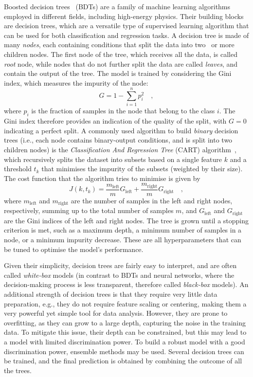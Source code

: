 Boosted decision trees~\cite{friedman2001greedy,freund1997decision} (BDTs) are a family of machine learning algorithms employed in different fields, including high-energy physics. Their building blocks are decision trees, which are a versatile type of supervised learning algorithm that can be used for both classification and regression tasks. A decision tree is made of many \emph{nodes}, each containing conditions that split the data into two~\cite{breiman2017classification} or more~\cite{quinlan1986induction} children nodes. The first node of the tree, which receives all the data, is called \emph{root} node, while nodes that do not further split the data are called \emph{leaves}, and contain the output of the tree. The model is trained by considering the Gini index, which measures the impurity of the node:
\begin{equation*}
    G = 1 - \sum_{i=1}^{n} p_{i}^{2}\quad ,
\end{equation*}
where $p_{i}$ is the fraction of samples in the node that belong to the class $i$. The Gini index therefore provides an indication of the quality of the split, with $G=0$ indicating a perfect split. A commonly used algorithm to build \emph{binary} decision trees (i.e., each node contains binary-output conditions, and is split into two children nodes) is the \emph{Classification And Regression Tree} (CART) algorithm~\cite{breiman2017classification}, which recursively splits the dataset into subsets based on a single feature $k$ and a threshold $t_k$ that minimises the impurity of the subsets (weighted by their size). The cost function that the algorithm tries to minimise is given by
\begin{equation*}
    J(k,t_k) = \frac{m_{\mathrm{left}}}{m}G_{\mathrm{left}} + \frac{m_{\mathrm{right}}}{m}G_{\mathrm{right}}\quad ,
\end{equation*}
where $m_{\mathrm{left}}$ and $m_{\mathrm{right}}$ are the number of samples in the left and right nodes, respectively, summing up to the total number of samples $m$, and $G_{\mathrm{left}}$ and $G_{\mathrm{right}}$ are the Gini indices of the left and right nodes. The tree is grown until a stopping criterion is met, such as a maximum depth, a minimum number of samples in a node, or a minimum impurity decrease. These are all hyperparameters that can be tuned to optimise the model's performance.

Given their simplicity, decision trees are fairly easy to interpret, and are often called \emph{white-box} models (in contrast to BDTs and neural networks, where the decision-making process is less transparent, therefore called \emph{black-box} models). An additional strength of decision trees is that they require
very little data preparation, e.g., they do not require feature scaling or centering, making them a very powerful yet simple tool for data analysis. However, they are prone to overfitting, as they can grow to a large depth, capturing the noise in the training data. To mitigate this issue, their depth can be constrained, but this may lead to a model with limited discrimination power. To build a robust model with a good discrimination power, ensemble methods may be used. Several decision trees can be trained, and the final prediction is obtained by combining the outcome of all the trees. 


